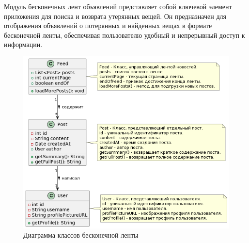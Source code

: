 Модуль бесконечных лент объявлений представляет собой ключевой элемент приложения для поиска и возврата утерянных вещей. Он предназначен для отображения объявлений о потерянных и найденных вещах в формате бесконечной ленты, обеспечивая пользователю удобный и непрерывный доступ к информации.

\begin{figure}[htb]
	\centering
	\includegraphics[width=.6\textwidth]{images/feed-diagram.png}
	\parskip=6pt
	\caption{Диаграмма классов бесконечной ленты}
	\label{fig:feedDiagram}
\end{figure}

